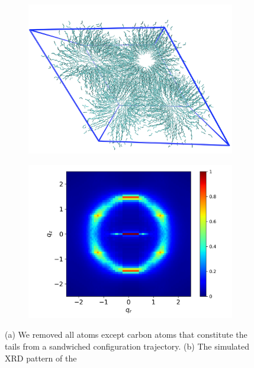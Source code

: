 \documentclass[journal=jpcbfk,manusciprt=article]{achemso}
\begin{document}
  \begin{figure}
	\centering
	\begin{subfigure}{0.45\linewidth}
		\centering
	 	\vspace{-2em}
		\includegraphics[width=\textwidth]{tails_topview.png}  %
		\caption{}\label{fig:topdown_tails_only}
	\end{subfigure}
	\begin{subfigure}{0.45\linewidth}
		\centering
		\includegraphics[width=\textwidth]{tails_rzplot.png}
		\caption{}\label{fig:tails_rzplot}
	\end{subfigure}
	\caption{(a) We removed all atoms except carbon atoms that constitute the tails from a 
	sandwiched configuration trajectory. (b) The simulated XRD pattern of the
}
\end{figure}
\end{document}
